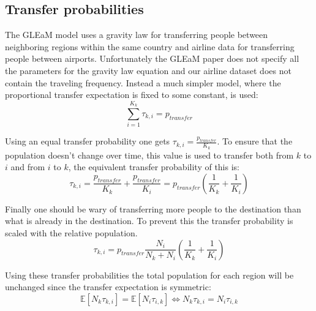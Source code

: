 \subsection{Transfer probabilities}

The GLEaM model \cite{GLEaM} uses a gravity law for transferring people between neighboring regions within the same country and airline data for transferring people between airports. Unfortunately the GLEaM paper does not specify all the parameters for the gravity law equation and our airline dataset does not contain the traveling frequency. Instead a much simpler model, where the proportional transfer expectation is fixed to some constant, is used:
\begin{equation}
\sum_{i = 1}^{K_k} \tau_{k, i} = p_{transfer}
\end{equation}

Using an equal transfer probability one gets $\tau_{k, i} = \frac{p_{transfer}}{K_k}$. To ensure that the population doesn't change over time, this value is used to transfer both from $k$ to $i$ and from $i$ to $k$, the equivalent transfer probability of this is:
\begin{equation}
\tau_{k, i} = \frac{p_{transfer}}{K_k} + \frac{p_{transfer}}{K_i} = p_{transfer} \left(\frac{1}{K_k} + \frac{1}{K_i}\right)
\end{equation}

Finally one should be wary of transferring more people to the destination than what is already in the destination. To prevent this the transfer probability is scaled with the relative population.
\begin{equation}
\tau_{k, i} = p_{transfer} \frac{N_i}{N_k + N_i} \left(\frac{1}{K_k} + \frac{1}{K_i}\right)
\end{equation}

Using these transfer probabilities the total population for each region will be unchanged since the transfer expectation is symmetric:
\begin{equation}
\mathbb{E}[N_k \tau_{k, i}] = \mathbb{E}[N_i \tau_{i, k}] \Leftrightarrow N_k \tau_{k, i} = N_i \tau_{i, k}
\end{equation}
